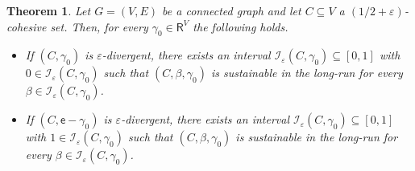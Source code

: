 \documentclass[letterpaper,11pt]{article}
\newcommand{\RR}{\mathsf{R}}
\newcommand{\nsf}{\mathsf{N}}
\newcommand{\degsf}{\mathsf{deg}}
\newtheorem{theorem}{Theorem}
\newcommand{\vvcom}[1]{\todo[color=red!25!white]{Victor: #1}}
\begin{document}
\begin{theorem}
\label{thm:longrun}
Let $G=(V,E)$ be a connected graph and let $C\subseteq V$ a $(1/2+\varepsilon)$-cohesive set.
Then, for every $\gamma_0\in \RR^V$ the following holds.
\begin{itemize}
	\item[$(a)$] If $(C,\gamma_0)$ is $\varepsilon$-divergent, there exists an interval $\mathcal{I}_{\varepsilon}(C,\gamma_0)\subseteq [0,1]$ with $0\in \mathcal{I}_{\varepsilon}(C,\gamma_0)$ such that $(C,\beta,\gamma_0)$ is sustainable in the long-run for every $\beta \in \mathcal{I}_{\varepsilon}(C,\gamma_0)$.
	\item[$(b)$]  If $(C,\mathsf{e}-\gamma_0)$ is $\varepsilon$-divergent, there exists an interval $\mathcal{I}_{\varepsilon}(C,\gamma_0)\subseteq [0,1]$ with $1\in \mathcal{I}_{\varepsilon}(C,\gamma_0)$ such that $(C,\beta,\gamma_0)$ is sustainable in the long-run for every $\beta \in \mathcal{I}_{\varepsilon}(C,\gamma_0)$.
\end{itemize}
\end{theorem}
\end{document}
